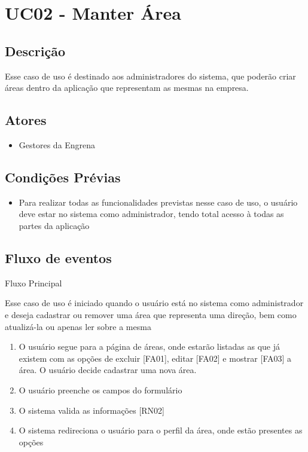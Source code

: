 \section{UC02 - Manter Área}

\subsection{Descrição}

Esse caso de uso é destinado aos administradores do sistema, que poderão criar áreas dentro da aplicação que representam as mesmas na empresa.

\subsection{Atores}

\begin{itemize}
  \item{Gestores da Engrena}
\end{itemize}


\subsection{Condições Prévias}

\begin{itemize}
  \item{Para realizar todas as funcionalidades previstas nesse caso de uso, o usuário deve estar no sistema como administrador, tendo total acesso à todas as partes da aplicação}
\end{itemize}


\subsection{Fluxo de eventos}

Fluxo Principal

Esse caso de uso é iniciado quando o usuário está no sistema como administrador e deseja cadastrar ou remover uma área que representa uma direção, bem como atualizá-la ou apenas ler sobre a mesma

\begin{enumerate}
  \item{O usuário segue para a página de áreas, onde estarão listadas as que já existem com as opções de excluir [FA01], editar [FA02] e mostrar [FA03] a área. O usuário decide cadastrar uma nova área.}
  \item{O usuário preenche os campos do formulário}
  \item{O sistema valida as informações [RN02]}
  \item{O sistema redireciona o usuário para o perfil da área, onde estão presentes as opções}
\end{enumerate}


